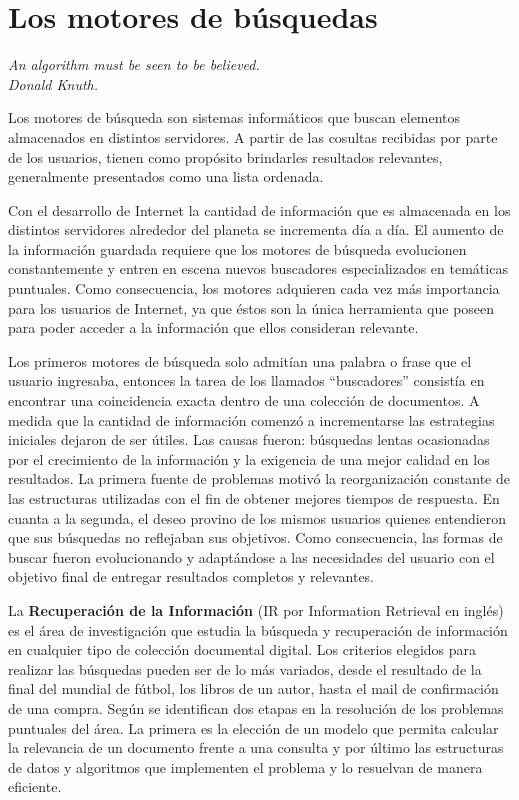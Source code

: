 \section{Los motores de búsquedas}
{\begin{small}%
\begin{flushright}%
\it An algorithm must be seen to be believed.\\Donald Knuth.
\end{flushright}%
\end{small}%
\vspace{.5cm}}
Los motores de búsqueda son sistemas informáticos que buscan elementos almacenados en distintos servidores. A partir de las cosultas recibidas por parte de los usuarios, tienen como propósito brindarles resultados relevantes, generalmente presentados como una lista ordenada.

Con el desarrollo de Internet la cantidad de información que es almacenada en los distintos servidores alrededor del planeta se incrementa día a día. El aumento de la información guardada requiere que los motores de búsqueda evolucionen constantemente y entren en escena nuevos buscadores especializados en temáticas puntuales. Como consecuencia, los motores adquieren cada vez más importancia para los usuarios de Internet, ya que éstos son la única herramienta que poseen para poder acceder a la información que ellos consideran relevante.

Los primeros motores de búsqueda solo admitían una palabra o frase que el usuario ingresaba, entonces la tarea de los llamados ``buscadores'' consistía en encontrar una coincidencia exacta dentro de una colección de documentos. A medida que la cantidad de información comenzó a incrementarse las estrategias iniciales dejaron de ser útiles. Las causas fueron: búsquedas lentas ocasionadas por el crecimiento de la información y la exigencia de una mejor calidad en los resultados. La primera fuente de problemas motivó la reorganización constante de las estructuras utilizadas con el fin de obtener mejores tiempos de respuesta. En cuanta a la segunda, el deseo provino de los mismos usuarios quienes entendieron que sus búsquedas no reflejaban sus objetivos. Como consecuencia, las formas de buscar fueron evolucionando y adaptándose a las necesidades del usuario con el objetivo final de entregar resultados completos y relevantes.

La \textbf{Recuperación de la Información} (IR por Information Retrieval en inglés) \cite{Baeza-Yates:1999:MIR:553876,Manning:2008:IIR:1394399,Zobel:2006:IFT:1132956.1132959} es el área de investigación que estudia la búsqueda y recuperación de información en cualquier tipo de colección documental digital. Los criterios elegidos para realizar las búsquedas pueden ser de lo más variados, desde el resultado de la final del mundial de fútbol, los libros de un autor, hasta el mail de confirmación de una compra. Según \cite{Baeza-Yates:1999:MIR:553876} se identifican dos etapas en la resolución de los problemas puntuales del área. La primera es la elección de un modelo que permita calcular la relevancia de un documento frente a una consulta y por último las estructuras de datos y algoritmos que implementen el problema y lo resuelvan de manera eficiente.


